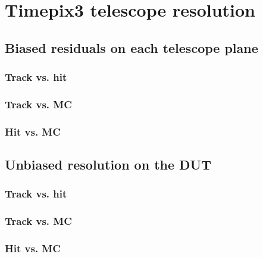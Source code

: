 \section{Timepix3 telescope resolution}
\label{sec:TelescopeResolution}


\subsection{Biased residuals on each telescope plane}

\subsubsection{Track vs. hit}
\subsubsection{Track vs. MC}
\subsubsection{Hit vs. MC}

\subsection{Unbiased resolution on the DUT}
\subsubsection{Track vs. hit}
\subsubsection{Track vs. MC}
\subsubsection{Hit vs. MC}
